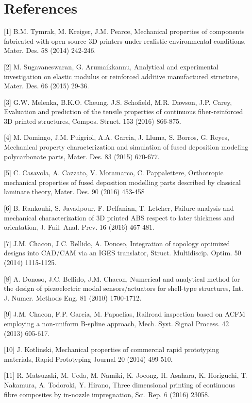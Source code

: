\documentclass[10pt]{article}
\begin{document}
\section*{References}
[1] B.M. Tymrak, M. Kreiger, J.M. Pearce, Mechanical properties of components fabricated with open-source 3D printers under realistic environmental conditions, Mater. Des. 58 (2014) 242-246.

[2] M. Sugavaneswaran, G. Arumaikkannu, Analytical and experimental investigation on elastic modulus or reinforced additive manufactured structure, Mater. Des. 66 (2015) 29-36.

[3] G.W. Melenka, B.K.O. Cheung, J.S. Schofield, M.R. Dawson, J.P. Carey, Evaluation and prediction of the tensile properties of continuous fiber-reinforced 3D printed structures, Compos. Struct. 153 (2016) 866-875.

[4] M. Domingo, J.M. Puigriol, A.A. Garcia, J. Lluma, S. Borros, G. Reyes, Mechanical property characterization and simulation of fused deposition modeling polycarbonate parts, Mater. Des. 83 (2015) 670-677.

[5] C. Casavola, A. Cazzato, V. Moramarco, C. Pappalettere, Orthotropic mechanical properties of fused deposition modelling parts described by classical laminate theory, Mater. Des. 90 (2016) 453-458

[6] B. Rankouhi, S. Javadpour, F. Delfanian, T. Letcher, Failure analysis and mechanical characterization of 3D printed ABS respect to later thickness and orientation, J. Fail. Anal. Prev. 16 (2016) 467-481.

[7] J.M. Chacon, J.C. Bellido, A. Donoso, Integration of topology optimized designs into CAD/CAM via an IGES translator, Struct. Multidiscip. Optim. 50 (2014) 1115-1125.

[8] A. Donoso, J.C. Bellido, J.M. Chacon, Numerical and analytical method for the design of piezoelectric modal sensors/actuators for shell-type structures, Int. J. Numer. Methods Eng. 81 (2010) 1700-1712.

[9] J.M. Chacon, F.P. Garcia, M. Papaelias, Railroad inspection based on ACFM employing a non-uniform B-spline approach, Mech. Syst. Signal Process. 42 (2013) 605-617.

[10] J. Kotlinski, Mechanical properties of commercial rapid prototyping materials, Rapid Prototyping Journal 20 (2014) 499-510.

[11] R. Matsuzaki, M. Ueda, M. Namiki, K. Joeong, H. Asahara, K. Horiguchi, T. Nakamura, A. Todoroki, Y. Hirano, Three dimensional printing of continuous fibre composites by in-nozzle impregnation, Sci. Rep. 6 (2016) 23058.
\end{document}
